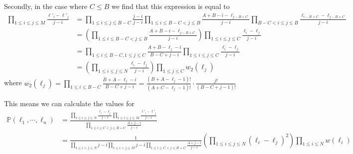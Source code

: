 \documentclass[12pt]{article}
\begin{document}
	Secondly, in the case where $C\leq B$ we find that this expression is equal to  \begin{align*}
	\prod_{1\leq i \leq j \leq M}\frac{\ell'_i-\ell'_j}{j-i}
	&=\prod_{1\leq i \leq j\leq  B-C}\frac{j-i}{j-i}
	\prod_{1\leq i \leq B-C < j \leq B}\frac{A+B-i-\ell_{j-B+C}}{j-i}
	\prod_{B-C< i\leq j \leq B}\frac{\ell_{i-B+C}-\ell_{j-B+C}}{j-i}\\
	&=\left(\prod_{1\leq i \leq B-C < j \leq B}\frac{A+B-i-\ell_{j-B+C}}{j-i}\right)
	\prod_{1\leq i\leq j \leq C}\frac{\ell_{i}-\ell_{j}}{j-i}\\
	&=\prod_{1\leq i \leq B-C, 1\leq j \leq C}\frac{A+B-\ell_j-i}{B-C+j-i}\prod_{1\leq i\leq j \leq C}\frac{\ell_{i}-\ell_{j}}{j-i}\\
	&=\left(\prod_{1\leq i \leq j \leq N}\frac{\ell_i-\ell_j}{j-i}\right)\prod_{1\leq j \leq C}w_2(\ell_j)
	\end{align*}
	where $w_2(\ell_j)=\prod_{1\leq i \leq B-C}\frac{B+A-\ell_j-i}{B-C+j-i}=\frac{(B+A-\ell_j-1)!}{(A+C-\ell_j-1)!}\cdot \frac{j!}{(B-C+j-1)!}$
	
	This means we can calculate the values for \begin{align*}
	\mathbb{P}(\ell_1,\cdots,\ell_n)&=
	\frac{\prod_{1\leq i \leq j \leq N}\frac{\ell_i-\ell_j}{j-i}\prod_{1\leq i \leq j \leq M}\frac{\ell'_i-\ell'_j}{j-i}}{\prod_{1\leq i \leq C<j\leq B+C} \frac{A+j-i}{j-i}}\\
	&=\frac{1}{\prod_{1\leq i < j \leq N} {j-i}\prod_{1\leq i < j \leq M}j-i\prod_{1\leq i \leq C<j\leq B+C} \frac{A+j-i}{j-i}}\left(\prod_{1\leq i \leq j \leq N} (\ell_i-\ell_j)^2\right)\prod_{1\leq i \leq N} w(\ell_i)
	\end{align*}
\end{document}
